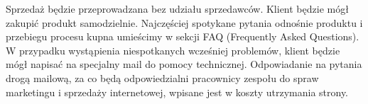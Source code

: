 \documentclass[12pt]{article}
\begin{document}
\begin{table}[h!]
 \begin{center}
 \caption{Prognoza sprzedaży na pierwsze 4 lata}
 \label{table:sales}
 \end{center}
\end{table}

Sprzedaż będzie przeprowadzana bez udziału sprzedawców.
Klient będzie mógł zakupić produkt samodzielnie.
Najczęściej spotykane pytania odnośnie produktu i przebiegu procesu kupna umieścimy w sekcji FAQ (Frequently Asked Questions).
W przypadku wystąpienia niespotkanych wcześniej problemów, klient będzie mógł napisać na specjalny mail do pomocy technicznej.
Odpowiadanie na pytania drogą mailową, za co będą odpowiedzialni pracownicy zespołu do spraw marketingu i sprzedaży internetowej, wpisane jest w koszty utrzymania strony.
\end{document}

